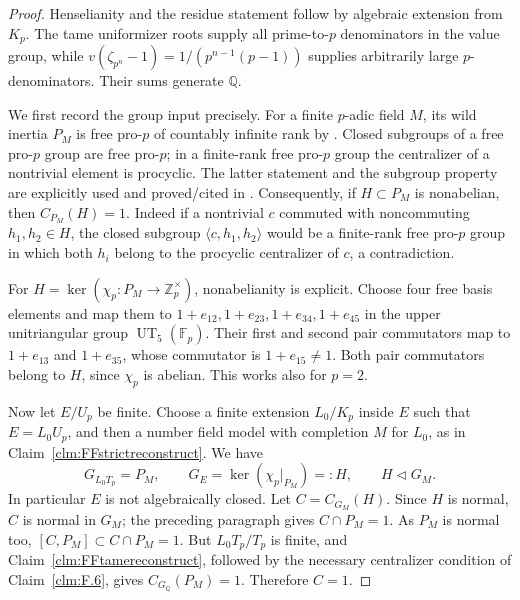 \documentclass[11pt]{article}
\begin{document}
\begin{proof}
Henselianity and the residue statement follow by
algebraic extension from \(K_p\). The tame
uniformizer roots supply all prime-to-\(p\)
denominators in the value group, while
\(v(\zeta_{p^n}-1)=1/(p^{n-1}(p-1))\)
supplies arbitrarily large \(p\)-denominators.
Their sums generate \(\mathbb Q\).

We first record the group input precisely.
For a finite \(p\)-adic field \(M\), its wild
inertia \(P_M\) is free pro-\(p\) of countably
infinite rank by
\citet[Theorem~2(ii), p.~463]{FF_Iwasawa1955}.
Closed subgroups of a free pro-\(p\) group are
free pro-\(p\); in a finite-rank free pro-\(p\)
group the centralizer of a nontrivial element
is procyclic. The latter statement and the
subgroup property are explicitly used and
proved/cited in
\citet[Theorem~5.1, proof, Case~I]{FF_KochloukovaZalesskii2011}.
Consequently, if \(H\subset P_M\) is nonabelian,
then \(C_{P_M}(H)=1\). Indeed if a nontrivial
\(c\) commuted with noncommuting
\(h_1,h_2\in H\), the closed subgroup
\(\langle c,h_1,h_2\rangle\) would be a
finite-rank free pro-\(p\) group in which both
\(h_i\) belong to the procyclic centralizer
of \(c\), a contradiction.

For
\(H=\ker(\chi_p:P_M\to\mathbb Z_p^\times)\),
nonabelianity is explicit. Choose four free
basis elements and map them to
\(1+e_{12},1+e_{23},1+e_{34},1+e_{45}\)
in the upper unitriangular group
\(\operatorname{UT}_5(\mathbb F_p)\).
Their first and second pair commutators map
to \(1+e_{13}\) and \(1+e_{35}\), whose
commutator is \(1+e_{15}\ne1\).
Both pair commutators belong to \(H\), since
\(\chi_p\) is abelian. This works also for
\(p=2\).

Now let \(E/U_p\) be finite. Choose a finite
extension \(L_0/K_p\) inside \(E\) such that
\(E=L_0U_p\), and then a number field model
with completion \(M\) for \(L_0\), as in
Claim~\ref{clm:FFstrictreconstruct}. We have
\[
 G_{L_0T_p}=P_M,
 \qquad G_E=\ker(\chi_p|_{P_M})=:H,
 \qquad H\triangleleft G_M.                            \tag{F.31.3}
\]
In particular \(E\) is not algebraically closed.
Let \(C=C_{G_M}(H)\). Since \(H\) is normal,
\(C\) is normal in \(G_M\); the preceding
paragraph gives \(C\cap P_M=1\).
As \(P_M\) is normal too,
\([C,P_M]\subset C\cap P_M=1\).
But \(L_0T_p/T_p\) is finite, and
Claim~\ref{clm:FFtamereconstruct}, followed by
the necessary centralizer condition of
Claim~\ref{clm:F.6}, gives
\(C_{G_{\mathbb Q}}(P_M)=1\).
Therefore \(C=1\).


\end{proof}
\end{document}
